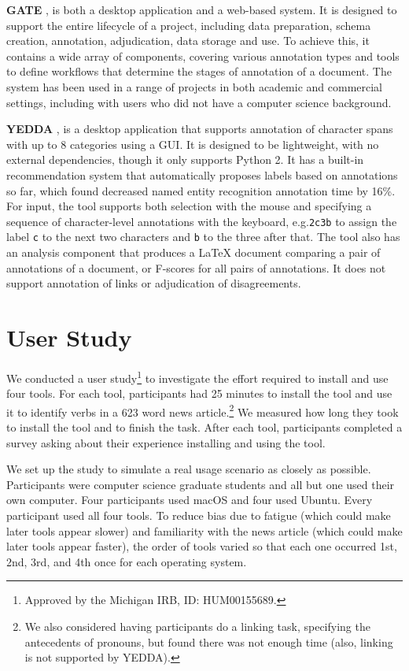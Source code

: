 \documentclass[11pt,a4paper]{article}
\makeatletter
\newcommand{\myeg}{e.g.\@\xspace}
\newcommand{\tightparagraph}[1]{\noindent\textbf{#1}}
\makeatother
\begin{document}
\tightparagraph{GATE} \citep{gate}, is both a desktop application and a web-based system.
It is designed to support the entire lifecycle of a project, including data preparation, schema creation, annotation, adjudication, data storage and use.
To achieve this, it contains a wide array of components, covering various annotation types and tools to define workflows that determine the stages of annotation of a document.
The system has been used in a range of projects in both academic and commercial settings, including with users who did not have a computer science background.

\tightparagraph{YEDDA} \citep{yedda}, is a desktop application that supports annotation of character spans with up to 8 categories using a GUI.
It is designed to be lightweight, with no external dependencies, though it only supports Python 2.
It has a built-in recommendation system that automatically proposes labels based on annotations so far, which \citet{yedda} found decreased named entity recognition annotation time by 16\%.
For input, the tool supports both selection with the mouse and specifying a sequence of character-level annotations with the keyboard, \myeg \texttt{2c3b} to assign the label \texttt{c} to the next two characters and \texttt{b} to the three after that.
The tool also has an analysis component that produces a LaTeX document comparing a pair of annotations of a document, or F-scores for all pairs of annotations.
It does not support annotation of links or adjudication of disagreements.

\section{User Study}

We conducted a user study\footnote{
  Approved by the Michigan IRB, ID: HUM00155689.
} to investigate the effort required to install and use four tools.
For each tool, participants had 25 minutes to install the tool and use it to identify verbs in a 623 word news article.\footnote{
  We also considered having participants do a linking task, specifying the antecedents of pronouns, but found there was not enough time (also, linking is not supported by YEDDA).
}
We measured how long they took to install the tool and to finish the task.
After each tool, participants completed a survey asking about their experience installing and using the tool.

We set up the study to simulate a real usage scenario as closely as possible.
Participants were computer science graduate students and all but one used their own computer.
Four participants used macOS and four used Ubuntu.
Every participant used all four tools.
To reduce bias due to fatigue (which could make later tools appear slower) and familiarity with the news article (which could make later tools appear faster), the order of tools varied so that each one occurred 1st, 2nd, 3rd, and 4th once for each operating system.
\end{document}
